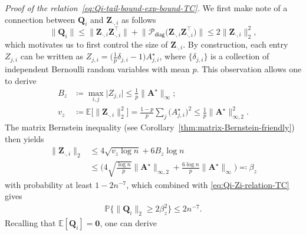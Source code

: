 \bigskip\noindent
{\em Proof of the relation~\eqref{eq:Qi-tail-bound-exp-bound-TC}.}
%
We first make note of a connection between $\bm{Q}_{i}$ and $\bm{Z}_{\cdot,i}$ as follows
%
\begin{equation}
	\big\|\bm{Q}_{i}\big\|\leq\big\|\bm{Z}_{\cdot,i}\bm{Z}_{\cdot,i}^{\top}\big\|+\big\|\mathcal{P}_{\mathsf{diag}}\big(\bm{Z}_{\cdot,i}\bm{Z}_{\cdot,i}^{\top}\big)\big\|\leq2\big\|\bm{Z}_{\cdot,i}\big\|_{2}^{2},
	\label{eq:Qi-Zi-relation-TC}
\end{equation}
%
which motivates us to first control the size of $\bm{Z}_{\cdot,i}$.
By construction, each entry $Z_{j,i}$ can be written as $Z_{j,i}= \big(\frac{1}{p} \delta_{j,i} -1\big) A_{j,i}^{\star}$, where $\{\delta_{j,i}\}$ is a collection of independent Bernoulli random variables with mean $p$. This observation allows one to derive  %
%
\begin{align*}
B_{z} & \coloneqq\max_{i,j}\big|Z_{j,i}\big|\leq \frac{1}{p} \big\|\bm{A}^{\star}\big\|_{\infty} ;\\
v_{z} & \coloneqq\mathbb{E}\Big[\big\|\bm{Z}_{\cdot,i}\big\|_{2}^{2}\Big] = \frac{1-p}{p}\sum\nolimits_{j}\big(A_{j,i}^{\star}\big)^{2} \leq\frac{1}{p}\big\|\bm{A}^{\star}\big\|_{\infty,2}^{2} .
\end{align*}
%
The matrix Bernstein inequality (see Corollary~\ref{thm:matrix-Bernstein-friendly})  then yields
%
\begin{align}
\big\|\bm{Z}_{\cdot,i}\big\|_{2} & \leq4\sqrt{v_{z}\log n}+6B_{z}\log n\nonumber\\
 & \leq \Bigg(4\sqrt{\frac{\log n}{p}}\big\|\bm{A}^{\star}\big\|_{\infty,2}+\frac{6\log n}{p}\big\|\bm{A}^{\star}\big\|_{\infty}\Bigg) \eqqcolon\beta_{z}
\label{eq:Zi-UB-betaz-TC}
\end{align}
%
with probability at least $1-2n^{-7}$, which combined with \eqref{eq:Qi-Zi-relation-TC} gives
%
\begin{align}
	\mathbb{P}\Big\{ \big\|\bm{Q}_{i}\big\|_{2}  \geq 2\beta_{z}^2 \Big\} \leq 2n^{-7}.
\label{eq:Qi-Zi-UB-betaz-TC}
\end{align}
%
Recalling that $\mathbb{E}[\bm{Q}_i]=\bm{0}$, one can derive
